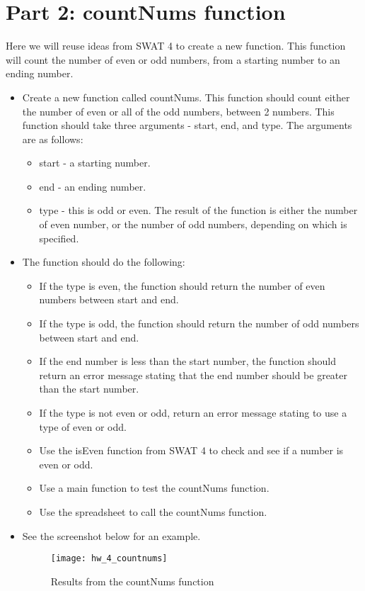 \documentclass{article}
\begin{document}
\section*{Part 2: countNums function}
Here we will reuse ideas from SWAT 4 to create a new function.  This function will count the number of even or odd numbers, from a starting number to an ending number.
\begin{itemize}
	\item Create a new function called countNums.  This function should count either the number of even or all of the odd numbers, between 2 numbers.  This function should take three arguments - start, end, and type.  The arguments are as follows:
	\begin{itemize}
		\item start - a starting number.
		\item end - an ending number.
		\item type - this is odd or even.  The result of the function is either the number of even number, or the number of odd numbers, depending on which is specified.
	\end{itemize}
	\item The function should do the following:
	\begin{itemize}
		\item If the type is even, the function should return the number of even numbers between start and end.
		\item If the type is odd, the function should return the number of odd numbers between start and end.
		\item If the end number is less than the start number, the function should return an error message stating that the end number should be greater than the start number.
		\item If the type is not even or odd, return an error message stating to use a type of even or odd.
		\item Use the isEven function from SWAT 4 to check and see if a number is even or odd.
		\item Use a main function to test the countNums function.
		\item Use the spreadsheet to call the countNums function.
	\end{itemize}
	\item See the screenshot below for an example.
	\begin{figure}[H]
  		\centering
  		\texttt{[image: hw\_4\_countnums]}
  		\caption{Results from the countNums function}
	\end{figure}
\end{itemize}
\end{document}
